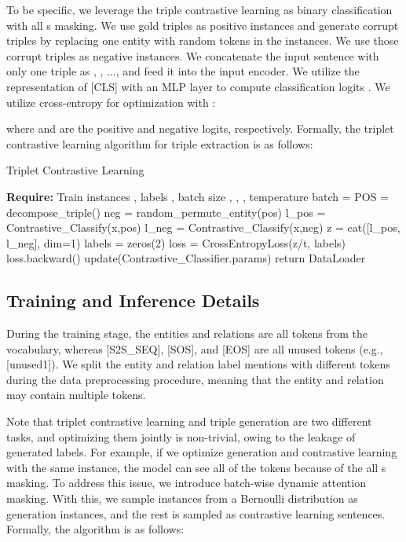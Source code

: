 \documentclass[letterpaper]{article} \usepackage{aaai21}  \usepackage{times}  \usepackage{helvet} \usepackage{courier}  \usepackage[hyphens]{url}  \usepackage{graphicx} \urlstyle{rm} \def\UrlFont{\rm}  \usepackage{natbib}  \usepackage[noend]{algpseudocode}
\begin{document}
To be specific, we leverage the triple contrastive learning as binary classification with all s masking. We use gold triples as positive instances and generate corrupt triples by replacing one entity with random tokens in the instances. We use those corrupt triples as negative instances. We concatenate the input sentence with only one triple as , , ...,  and feed it into the input encoder. We utilize the representation of [CLS] with an MLP layer to compute classification logits . We utilize cross-entropy for optimization with :



where  and  are the positive and negative logits, respectively. Formally, the triplet contrastive learning algorithm for triple extraction is as follows:

\begin{algorithm}[th]
\begin{algorithmic}[1]
\caption{Triplet Contrastive Learning} 
 \State \textbf{Require:} Train instances , labels ,  batch size , , , temperature 
 \While{   }
   \State batch = 
    \State POS = decompose\_triple()
    \State neg = random\_permute\_entity(pos)
    \State l\_pos = Contrastive\_Classify(x,pos)
    \State l\_neg = Contrastive\_Classify(x,neg)
    \State z = cat([l\_pos, l\_neg], dim=1)
\State labels = zeros(2) 
    \State loss = CrossEntropyLoss(z/t, labels)
    \State loss.backward()
    \State update(Contrastive\_Classifier.params)
     \EndFor
    \EndFor
   \EndWhile
   \State return DataLoader
\label{batch} 
\end{algorithmic}
\end{algorithm}

\subsection{Training and Inference Details}

During the training stage, the entities and relations are all tokens from the vocabulary, whereas [S2S\_SEQ], [SOS], and [EOS] are all unused tokens (e.g., [unused1]). We split the entity and relation label mentions with different tokens during the data preprocessing procedure, meaning that the entity and relation may contain multiple tokens. 

Note that triplet contrastive learning and triple generation are two different tasks, and optimizing them jointly is non-trivial, owing to the leakage of generated labels. For example, if we optimize generation and contrastive learning with the same instance, the model can see all of the tokens because of the all s masking. To address this issue, we introduce batch-wise dynamic attention masking. With this, we sample instances from a Bernoulli distribution as generation instances, and the rest is sampled as contrastive learning sentences. Formally, the algorithm is as follows:
\end{document}
